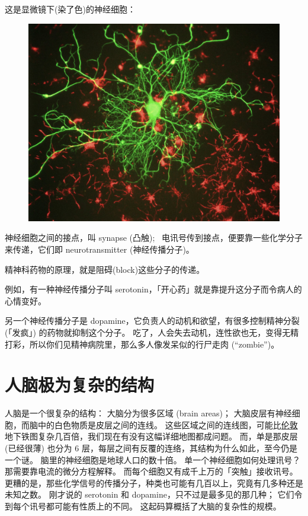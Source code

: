 \documentclass[12pt]{report}
\begin{document}
{这是显微镜下(染了色)的神经细胞：
\begin{figure}[H]
\centering
\includegraphics[scale=0.25]{neuron_in_tissue_culture.jpg}
\end{figure}

神经细胞之间的接点，叫 synapse (凸触); \ 电讯号传到接点，便要靠一些化学分子来传递，它们即 neurotransmitter (神经传播分子)。

精神科药物的原理，就是阻碍(block)这些分子的传递。

例如，有一种神经传播分子叫 serotonin，「开心药」就是靠提升这分子而令病人的心情变好。

另一个神经传播分子是 dopamine，它负责人的动机和欲望，有很多控制精神分裂 (「发疯」) 的药物就抑制这个分子。 吃了，人会失去动机，连性欲也无，变得无精打彩，所以你们见精神病院里，那么多人像发呆似的行尸走肉 (``zombie'')。

\section{人脑极为复杂的结构}

人脑是一个很复杂的结构： 大脑分为很多区域 (brain areas)； 大脑皮层有神经细胞，而脑中的白色物质是皮层之间的连线。 这些区域之间的连线图，可能比\uline{伦敦}地下铁图复杂几百倍，我们现在有没有这幅详细地图都成问题。 而，单是那皮层 (已经很薄) 也分为 6 层，每层之间有反覆的连络，其结构为什么如此，至今仍是一个谜。 脑里的神经细胞是地球人口的数十倍。 单一个神经细胞如何处理讯号？ 那需要靠电流的微分方程解释。 而每个细胞又有成千上万的「突触」接收讯号。 更糟的是，那些化学信号的传播分子，种类也可能有几百以上，究竟有几多种还是未知之数。 刚才说的 serotonin 和 dopamine，只不过是最多见的那几种； 它们令到每个讯号都可能有性质上的不同。 这起码算概括了大脑的复杂性的规模。

}
\end{document}
